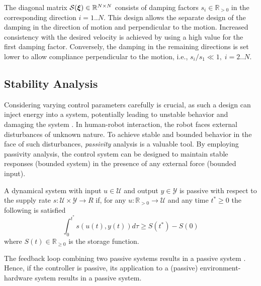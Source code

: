 The diagonal matrix $\mathcal{S}(\boldsymbol{\xi}) \in \mathbb{R}^{N \times N}$ consists of damping factors $s_i \in \mathbb{R}_{>0}$ in the corresponding direction $i = 1 .. N$.
This design allows the separate design of the damping in the direction of motion and perpendicular to the motion.
Increased consistency with the desired velocity is achieved by using a high value for the first damping factor. Conversely, the damping in the remaining directions is set lower to allow compliance perpendicular to the motion, i.e., $s_i / s_1 \ll 1, \; i = 2 .. N$.

\iflong
\subsection{Stability Analysis} \label{sec:trad_passive}
Considering varying control parameters carefully is crucial, as such a design can inject energy into a system, potentially leading to unstable behavior and damaging the system \cite{ferraguti2013tank}.
In human-robot interaction, the robot faces external disturbances of unknown nature. To achieve stable and bounded behavior in the face of such disturbances, \textit{passivity} analysis is a valuable tool. By employing passivity analysis, the control system can be designed to maintain stable responses (bounded system) in the presence of any external force (bounded input). 

\begin{definition} \label{def:passivity}
	A dynamical system with input $ u \in \mathcal{U}$ and output $y \in \mathcal{Y}$ is passive with respect to the supply rate $s : \mathcal{U} \times \mathcal{Y} \rightarrow{R}$ if, for any $u: \mathbb{R}_{>0} \rightarrow \mathcal{U}$ and any time $t^* \geq 0$ the following is satisfied
  \begin{equation}
	  \int_0^{t^*} s \left( u(t),  y (t) \right) d \tau \geq S(t^*) - S(0) 
  \end{equation}
  where $S(t) \in \mathbb{R}_{\geq 0}$ is the storage function.
\end{definition}

The feedback loop combining two passive systems results in a passive system \cite{sepulchre2012constructive}. Hence, if the controller is passive, its application to a (passive) environment-hardware system results in a passive system.
\fi
